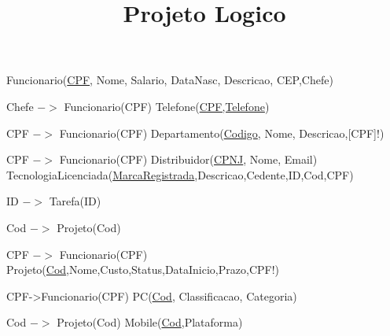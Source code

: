 \documentclass{article}
\title{Projeto Logico}
\begin{document}
\maketitle
\noindent Funcionario(\underline{CPF}, Nome, Salario, DataNasc, Descricao, CEP,Chefe)

\hspace{2cm}Chefe $->$ Funcionario(CPF)
\newline\newline
Telefone(\underline{CPF,Telefone})

\hspace{2cm} CPF $->$ Funcionario(CPF)
\newline\newline
Departamento(\underline{Codigo}, Nome, Descricao,[CPF]!)

\hspace{2cm}CPF $->$ Funcionario(CPF)
\newline\newline
Distribuidor(\underline{CPNJ}, Nome, Email)
\newline\newline
TecnologiaLicenciada(\underline{MarcaRegistrada},Descricao,Cedente,ID,Cod,CPF)

\hspace{2cm}ID $->$ Tarefa(ID)

\hspace{2cm}Cod $->$ Projeto(Cod)

\hspace{2cm}CPF $->$ Funcionario(CPF)
\newline\newline
Projeto(\underline{Cod},Nome,Custo,Status,DataInicio,Prazo,CPF!)

\hspace{2cm}CPF->Funcionario(CPF)
\newline\newline
PC(\underline{Cod}, Classificacao, Categoria)


\hspace{2cm}Cod $->$ Projeto(Cod)
\newline\newline
Mobile(\underline{Cod},Plataforma)
\end{document}
